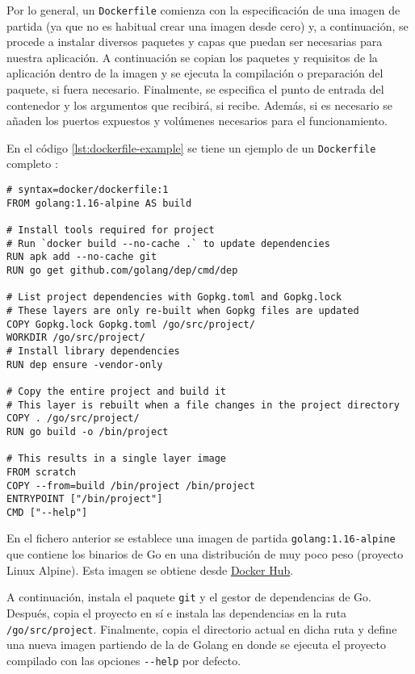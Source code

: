Por lo general, un \texttt{Dockerfile} comienza con la especificación de una imagen
de partida (ya que no es habitual crear una imagen desde cero) y, a continuación, se
procede a instalar diversos paquetes y capas que puedan ser necesarias para nuestra
aplicación. A continuación se copian los paquetes y requisitos de la aplicación
dentro de la imagen y se ejecuta la compilación o preparación del paquete, si
fuera necesario. Finalmente, se especifica el punto de entrada del contenedor y
los argumentos que recibirá, si recibe. Además, si es necesario se añaden los puertos
expuestos y volúmenes necesarios para el funcionamiento.

En el código \ref{lst:dockerfile-example} se tiene un ejemplo de un \texttt{Dockerfile}
completo \cite{BestPracticesWriting2021}:

\begin{lstlisting}[style=Dockerfile, caption={Ejemplo de \texttt{Dockerfile} para una aplicación Go \cite{BestPracticesWriting2021}.}, label={lst:dockerfile-example}]
# syntax=docker/dockerfile:1
FROM golang:1.16-alpine AS build

# Install tools required for project
# Run `docker build --no-cache .` to update dependencies
RUN apk add --no-cache git
RUN go get github.com/golang/dep/cmd/dep

# List project dependencies with Gopkg.toml and Gopkg.lock
# These layers are only re-built when Gopkg files are updated
COPY Gopkg.lock Gopkg.toml /go/src/project/
WORKDIR /go/src/project/
# Install library dependencies
RUN dep ensure -vendor-only

# Copy the entire project and build it
# This layer is rebuilt when a file changes in the project directory
COPY . /go/src/project/
RUN go build -o /bin/project

# This results in a single layer image
FROM scratch
COPY --from=build /bin/project /bin/project
ENTRYPOINT ["/bin/project"]
CMD ["--help"]
\end{lstlisting}

En el fichero anterior se establece una imagen de partida \texttt{golang:1.16-alpine}
que contiene los binarios de Go en una distribución de muy poco peso (proyecto Linux
Alpine). Esta imagen se obtiene desde \href{https://hub.docker.com/_/golang}{Docker Hub}.

A continuación, instala el paquete \texttt{git} y el gestor de dependencias de Go.
Después, copia el proyecto en sí e instala las dependencias en la ruta \texttt{/go/src/project}.
Finalmente, copia el directorio actual en dicha ruta y define una nueva imagen partiendo
de la de Golang en donde se ejecuta el proyecto compilado con las opciones
\texttt{-{}-help} por defecto.


